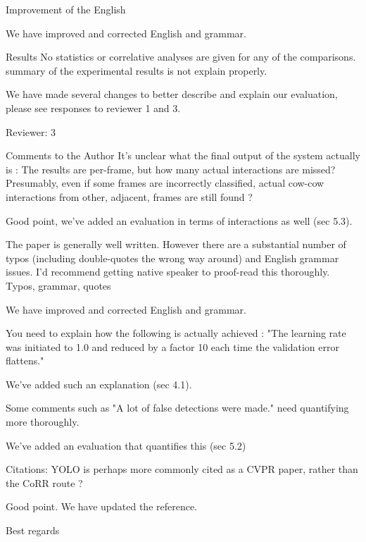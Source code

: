 \documentclass[10pt,a4paper]{letter}
\begin{document}
\begin{letter}{}
\begin{siderules}
Improvement of the English
\end{siderules}

We have improved and corrected English and grammar.

\begin{siderules}
Results No statistics or correlative analyses are given for any of the comparisons.
summary of the experimental results is not explain properly.
\end{siderules}

We have made several changes to better describe and explain our evaluation, please see responses to reviewer 1 and 3.

\begin{siderules}
Reviewer: 3

Comments to the Author
It's unclear what the final output of the system actually is : The results are per-frame, but how many actual interactions are missed? 
Presumably, even if some frames are incorrectly classified, actual cow-cow interactions from other, adjacent, frames are still found ?
\end{siderules}

Good point, we've added an evaluation in terms of interactions as well (sec 5.3).

\begin{siderules}
The paper is generally well written. However there are a substantial number of typos (including double-quotes the wrong way around) and English grammar issues. I'd recommend getting
native speaker to proof-read this thoroughly. Typos, grammar, quotes
\end{siderules}

We have improved and corrected English and grammar.

\begin{siderules}
You need to explain how the following is actually achieved : "The learning rate was initiated to 1.0 and reduced by a factor 10 each time the validation 
error flattens."
\end{siderules}

We've added such an explanation (sec 4.1).

\begin{siderules}
Some comments such as "A lot of false detections were made." need quantifying more thoroughly.
\end{siderules}

We've added an evaluation that quantifies this (sec 5.2)

\begin{siderules}
Citations: YOLO is perhaps more commonly cited as a CVPR paper, rather than the CoRR route ?
\end{siderules}

Good point. We have updated the reference.


 
\closing{Best regards} 
\end{letter} 
\end{document}
